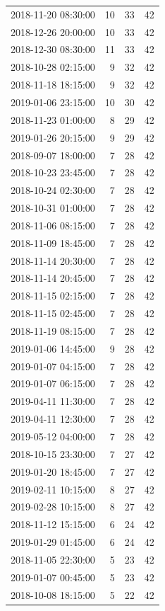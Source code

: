 \begin{tabular}{lrrr}
2018-11-20 08:30:00 & 10 & 33 & 42 \\
2018-12-26 20:00:00 & 10 & 33 & 42 \\
2018-12-30 08:30:00 & 11 & 33 & 42 \\
2018-10-28 02:15:00 & 9 & 32 & 42 \\
2018-11-18 18:15:00 & 9 & 32 & 42 \\
2019-01-06 23:15:00 & 10 & 30 & 42 \\
2018-11-23 01:00:00 & 8 & 29 & 42 \\
2019-01-26 20:15:00 & 9 & 29 & 42 \\
2018-09-07 18:00:00 & 7 & 28 & 42 \\
2018-10-23 23:45:00 & 7 & 28 & 42 \\
2018-10-24 02:30:00 & 7 & 28 & 42 \\
2018-10-31 01:00:00 & 7 & 28 & 42 \\
2018-11-06 08:15:00 & 7 & 28 & 42 \\
2018-11-09 18:45:00 & 7 & 28 & 42 \\
2018-11-14 20:30:00 & 7 & 28 & 42 \\
2018-11-14 20:45:00 & 7 & 28 & 42 \\
2018-11-15 02:15:00 & 7 & 28 & 42 \\
2018-11-15 02:45:00 & 7 & 28 & 42 \\
2018-11-19 08:15:00 & 7 & 28 & 42 \\
2019-01-06 14:45:00 & 9 & 28 & 42 \\
2019-01-07 04:15:00 & 7 & 28 & 42 \\
2019-01-07 06:15:00 & 7 & 28 & 42 \\
2019-04-11 11:30:00 & 7 & 28 & 42 \\
2019-04-11 12:30:00 & 7 & 28 & 42 \\
2019-05-12 04:00:00 & 7 & 28 & 42 \\
2018-10-15 23:30:00 & 7 & 27 & 42 \\
2019-01-20 18:45:00 & 7 & 27 & 42 \\
2019-02-11 10:15:00 & 8 & 27 & 42 \\
2019-02-28 10:15:00 & 8 & 27 & 42 \\
2018-11-12 15:15:00 & 6 & 24 & 42 \\
2019-01-29 01:45:00 & 6 & 24 & 42 \\
2018-11-05 22:30:00 & 5 & 23 & 42 \\
2019-01-07 00:45:00 & 5 & 23 & 42 \\
2018-10-08 18:15:00 & 5 & 22 & 42 \\

\end{tabular}

